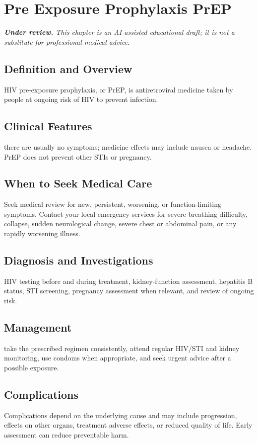 \chapter{Pre Exposure Prophylaxis PrEP}

\medskip
\noindent\textit{\textbf{Under review.} This chapter is an AI-assisted educational draft; it is not a substitute for professional medical advice.}

\section*{Definition and Overview}
HIV pre-exposure prophylaxis, or PrEP, is antiretroviral medicine taken by people at ongoing risk of HIV to prevent infection.

\section*{Clinical Features}
there are usually no symptoms; medicine effects may include nausea or headache. PrEP does not prevent other STIs or pregnancy.

\section*{When to Seek Medical Care}
Seek medical review for new, persistent, worsening, or function-limiting symptoms. Contact your local emergency services for severe breathing difficulty, collapse, sudden neurological change, severe chest or abdominal pain, or any rapidly worsening illness.

\section*{Diagnosis and Investigations}
HIV testing before and during treatment, kidney-function assessment, hepatitis B status, STI screening, pregnancy assessment when relevant, and review of ongoing risk.

\section*{Management}
take the prescribed regimen consistently, attend regular HIV/STI and kidney monitoring, use condoms when appropriate, and seek urgent advice after a possible exposure.

\section*{Complications}
Complications depend on the underlying cause and may include progression, effects on other organs, treatment adverse effects, or reduced quality of life. Early assessment can reduce preventable harm.

